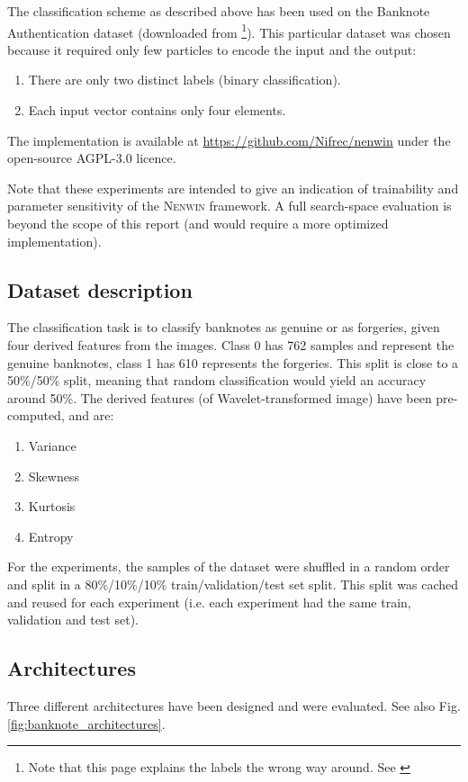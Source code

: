 The classification scheme as described above has been used on the Banknote Authentication dataset \cite{banknote_paper} (downloaded from \cite{banknote_download}\footnote{Note that this page explains the labels the wrong way around. See \cite{genuine_class_banknote}}).
This particular dataset was chosen because it required only few particles to encode the input and the output:
\begin{enumerate}
	\item There are only two distinct labels (binary classification).
	\item Each input vector contains only four elements.
\end{enumerate}

The implementation is available at \url{https://github.com/Nifrec/nenwin} under the open-source AGPL-3.0 licence\cite{AGPL_3}.

Note that these experiments are intended to give an indication of trainability and parameter sensitivity of the \textsc{Nenwin} framework. 
A full search-space evaluation is beyond the scope of this report (and would require a more optimized implementation).

\subsection{Dataset description}
The classification task is to classify banknotes as genuine or as forgeries, 
given four derived features from the images. 
Class 0 has 762 samples and represent the genuine banknotes,
class 1 has 610 represents the forgeries. 
This split is close to a 50\%/50\% split, meaning that random classification would yield an accuracy around 50\%.
The derived features (of Wavelet-transformed image) have been pre-computed, and are:
\begin{enumerate}
	\item Variance
	\item Skewness
	\item Kurtosis
	\item Entropy
\end{enumerate}

For the experiments, the samples of the dataset were shuffled in a random order and split in a 80\%/10\%/10\% train/validation/test set split. 
This split was cached and reused for each experiment (i.e. each experiment had the same train, validation and test set).

\subsection{Architectures}
Three different architectures have been designed and were evaluated. See also Fig. \ref{fig:banknote_architectures}.

